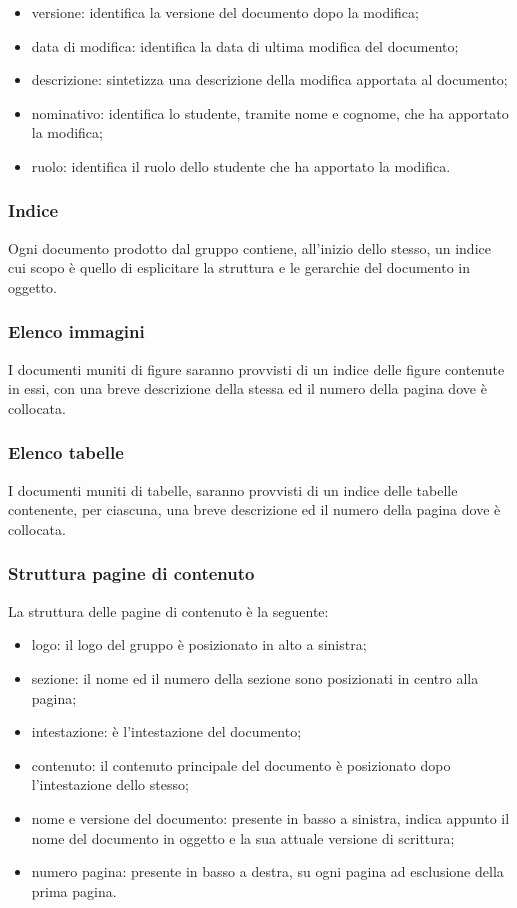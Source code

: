 \begin{itemize}
	\item versione: identifica la versione del documento dopo la modifica;
	\item data di modifica: identifica la data di ultima modifica del documento;
	\item descrizione: sintetizza una descrizione della modifica apportata al documento;
	\item nominativo: identifica lo studente, tramite nome e cognome, che ha apportato la modifica;
	\item ruolo: identifica il ruolo dello studente che ha apportato la modifica.
\end{itemize}

\subsubsection{Indice}
Ogni documento prodotto dal gruppo {\Gruppo} contiene, all’inizio dello stesso, un indice cui scopo è quello di esplicitare la struttura e le gerarchie del documento in oggetto. 

\subsubsection{Elenco immagini}
I documenti muniti di figure saranno provvisti di un indice delle figure contenute in essi, con una breve descrizione della stessa ed il numero della pagina dove è collocata.


\subsubsection{Elenco tabelle}
I documenti muniti di tabelle, saranno provvisti di un indice delle tabelle contenente, per
ciascuna, una breve descrizione ed il numero della pagina dove è collocata.

\subsubsection{Struttura pagine di contenuto}
La struttura delle pagine di contenuto è la seguente:
\begin{itemize}
	\item logo: il logo del gruppo è posizionato in alto a sinistra;
	\item sezione: il nome ed il numero della sezione sono posizionati in centro alla pagina;
	\item intestazione: è l’intestazione del documento;
	\item contenuto: il contenuto principale del documento è posizionato dopo l’intestazione dello stesso;
	\item nome e versione del documento: presente in basso a sinistra, indica appunto il nome del documento in oggetto e la sua attuale versione di scrittura;

	\item numero pagina: presente in basso a destra, su ogni pagina ad esclusione della prima pagina.
\end{itemize}



